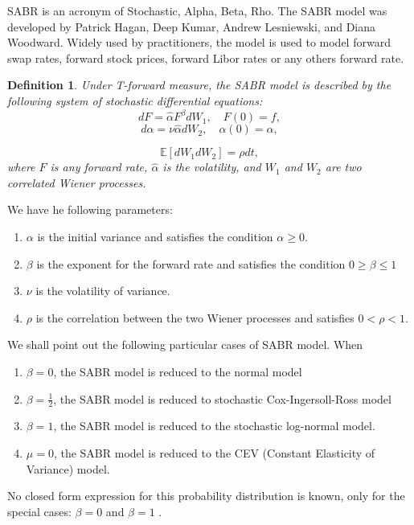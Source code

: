 \documentclass{book}
\newtheorem{definition}{Definition}[section]
\begin{document}
SABR is an acronym of Stochastic, Alpha, Beta, Rho. The SABR model was developed by Patrick Hagan, Deep Kumar, Andrew Lesniewski, and Diana Woodward. Widely used by practitioners, the model is used to model forward swap rates, forward stock prices, forward Libor rates or any others forward rate.
\begin{definition}
Under T-forward measure, the SABR model is described by the following system of stochastic differential equations:
$$
dF=\hat{\alpha}F^{\beta}dW_{1}, \quad F(0)=f,
$$
$$
d\hat{\alpha}=\nu\hat{\alpha}dW_{2},\quad \alpha(0)=\alpha,
$$

$$
\mathbb{E}[dW_{1}dW_{2}]=\rho dt, 
$$
where $F$ is any forward rate, $\hat{\alpha}$ is the volatility, and $W_{1}$ and $W_{2}$ are two correlated Wiener processes.
\end{definition}
We have he following parameters:
\begin{enumerate}
\item $\alpha$ is the initial variance and satisfies the condition $\alpha\geq 0.$
\item $\beta$ is the exponent for the forward rate and satisfies the condition $0\geq\beta\leq 1$
\item $\nu$ is the volatility of variance.
\item $\rho$ is the correlation between the two Wiener processes and satisfies $0<\rho<1$.
\end{enumerate}
We shall point out the following particular cases of SABR model. When
\begin{enumerate}
\item $\beta=0$, the SABR model is reduced to the normal model
\item $\beta=\frac{1}{2}$, the SABR model is reduced to stochastic Cox-Ingersoll-Ross model
\item $\beta=1$, the SABR model is reduced to the stochastic log-normal model.
\item $\mu=0$, the SABR model is reduced to the CEV (Constant Elasticity of Variance) model.
\end{enumerate}

No closed form expression for this probability distribution is known, only
for the special cases: $\beta=0$ and $\beta=1$ .
\end{document}
